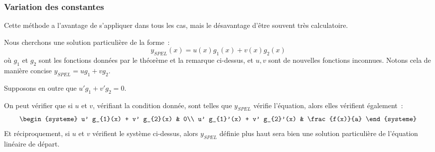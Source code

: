 \subsubsection{Variation des constantes}
\begin{frame}
  \begin{remark*}
Cette méthode a l'avantage de s'appliquer dans tous les cas, mais le désavantage d'être souvent très calculatoire.\pause
\end{remark*}

Nous cherchons une solution particulière de la forme~:\pause{}
\begin{equation*}
  y_{SPEL}(x) = u(x) g_{1}(x) + v(x) g_{2}(x)
\end{equation*}\pause
où \(g_{1}\) et \(g_{2}\) sont les fonctions données par le théorème et la remarque ci-dessus, et \(u,v\) sont de nouvelles fonctions inconnues.\pause{} Notons cela de manière concise \(y_{SPEL} = ug_{1} + v g_{2}\).\pause

Supposons en outre que \(u' g_{1} + v' g_{2}= 0\).\pause

On peut vérifier que si \(u\) et \(v\), vérifiant la condition donnée,\pause{} sont telles que \(y_{SPEL}\) vérifie l'équation,\pause{} alors elles vérifient également~:\pause
\begin{equation*}
  \begin{systeme}
    u' g_{1}(x) + v' g_{2}(x) & 0\\
    u' g_{1}'(x) +  v' g_{2}'(x) & \frac{f(x)}{a}
  \end{systeme}
\end{equation*}\pause
Et réciproquement, si \(u\) et \(v\) vérifient le système ci-dessus,\pause{} alors \(y_{SPEL}\) définie plus haut sera bien une solution particulière de l'équation linéaire de départ.\pause{}
\end{frame}

